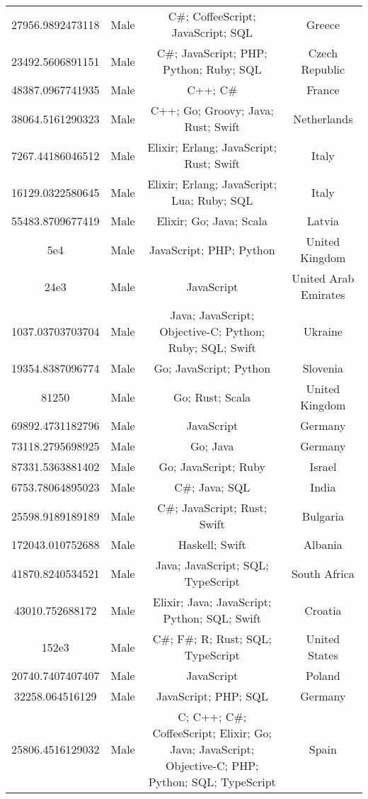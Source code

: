 \begin{center}
\begin{tabular}{ |c|c|c|c| }
27956.9892473118  &  Male  &  C\#; CoffeeScript; JavaScript; SQL  &  Greece  \\ 
23492.5606891151  &  Male  &  C\#; JavaScript; PHP; Python; Ruby; SQL  &  Czech Republic  \\ 
48387.0967741935  &  Male  &  C++; C\#  &  France  \\ 
38064.5161290323  &  Male  &  C++; Go; Groovy; Java; Rust; Swift  &  Netherlands  \\ 
7267.44186046512  &  Male  &  Elixir; Erlang; JavaScript; Rust; Swift  &  Italy  \\ 
16129.0322580645  &  Male  &  Elixir; Erlang; JavaScript; Lua; Ruby; SQL  &  Italy  \\ 
55483.8709677419  &  Male  &  Elixir; Go; Java; Scala  &  Latvia  \\ 
5e4  &  Male  &  JavaScript; PHP; Python  &  United Kingdom  \\ 
24e3  &  Male  &  JavaScript  &  United Arab Emirates  \\ 
1037.03703703704  &  Male  &  Java; JavaScript; Objective-C; Python; Ruby; SQL; Swift  &  Ukraine  \\ 
19354.8387096774  &  Male  &  Go; JavaScript; Python  &  Slovenia  \\ 
81250  &  Male  &  Go; Rust; Scala  &  United Kingdom  \\ 
69892.4731182796  &  Male  &  JavaScript  &  Germany  \\ 
73118.2795698925  &  Male  &  Go; Java  &  Germany  \\ 
87331.5363881402  &  Male  &  Go; JavaScript; Ruby  &  Israel  \\ 
6753.78064895023  &  Male  &  C\#; Java; SQL  &  India  \\ 
25598.9189189189  &  Male  &  C\#; JavaScript; Rust; Swift  &  Bulgaria  \\ 
172043.010752688  &  Male  &  Haskell; Swift  &  Albania  \\ 
41870.8240534521  &  Male  &  Java; JavaScript; SQL; TypeScript  &  South Africa  \\ 
43010.752688172  &  Male  &  Elixir; Java; JavaScript; Python; SQL; Swift  &  Croatia  \\ 
152e3  &  Male  &  C\#; F\#; R; Rust; SQL; TypeScript  &  United States  \\ 
20740.7407407407  &  Male  &  JavaScript  &  Poland  \\ 
32258.064516129  &  Male  &  JavaScript; PHP; SQL  &  Germany  \\ 
25806.4516129032  &  Male  &  C; C++; C\#; CoffeeScript; Elixir; Go; Java; JavaScript; Objective-C; PHP; Python; SQL; TypeScript  &  Spain  \\ 

\end{tabular}
\end{center}
